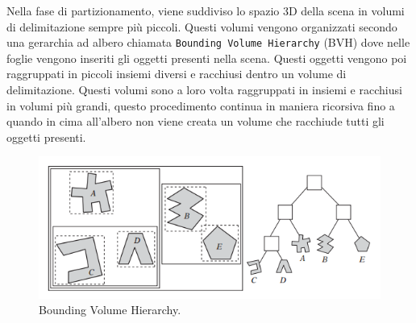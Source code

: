 Nella fase di partizionamento, viene suddiviso lo spazio 3D della scena in volumi di delimitazione sempre più piccoli. Questi volumi vengono organizzati secondo una gerarchia ad albero chiamata \texttt{Bounding Volume Hierarchy} (BVH) dove nelle foglie vengono inseriti gli oggetti presenti nella scena. 
Questi oggetti vengono poi raggruppati in piccoli insiemi diversi e racchiusi dentro un volume di delimitazione. Questi volumi sono a loro volta raggruppati in insiemi e racchiusi in volumi più grandi, questo procedimento continua in maniera ricorsiva fino a quando in cima all’albero non viene creata un volume che racchiude tutti gli oggetti presenti.

\begin{figure}[htb]
 \centering
 \includegraphics[width=1\linewidth]{images/chapter_navigazione_scena/partiz_tree.png}\hfill
 \caption[Bounding Volume Hierarchy.]{Bounding Volume Hierarchy.}
 \label{fig:navigazione_scena_partiz_tree}
\end{figure}

